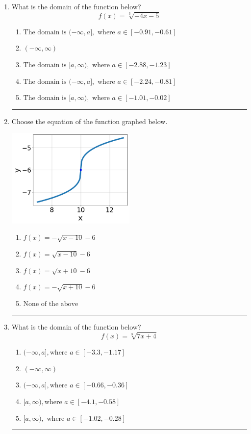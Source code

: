 \documentclass[14pt]{extbook}
\newcommand{\litem}[1]{\item#1\hspace*{-1cm}\rule{\textwidth}{0.4pt}}
\begin{document}
\begin{enumerate}
{\begin{enumerate}[label=\Alph*.]
\end{enumerate} }
\litem{
What is the domain of the function below?\[ f(x) = \sqrt[3]{-4 x - 5} \]\begin{enumerate}[label=\Alph*.]
\item \( \text{The domain is } (-\infty, a], \text{   where } a \in [-0.91, -0.61] \)
\item \( (-\infty, \infty) \)
\item \( \text{The domain is } [a, \infty), \text{   where } a \in [-2.88, -1.23] \)
\item \( \text{The domain is } (-\infty, a], \text{   where } a \in [-2.24, -0.81] \)
\item \( \text{The domain is } [a, \infty), \text{   where } a \in [-1.01, -0.02] \)

\end{enumerate} }
\litem{
Choose the equation of the function graphed below.
\begin{center}
    \includegraphics[width=0.5\textwidth]{../Figures/radicalGraphToEquationB.png}
\end{center}
\begin{enumerate}[label=\Alph*.]
\item \( f(x) = - \sqrt{x - 10} - 6 \)
\item \( f(x) = \sqrt{x - 10} - 6 \)
\item \( f(x) = \sqrt{x + 10} - 6 \)
\item \( f(x) = - \sqrt{x + 10} - 6 \)
\item \( \text{None of the above} \)

\end{enumerate} }
\litem{
What is the domain of the function below?\[ f(x) = \sqrt[8]{7 x + 4} \]\begin{enumerate}[label=\Alph*.]
\item \( (-\infty, a], \text{where } a \in [-3.3, -1.17] \)
\item \( (-\infty, \infty) \)
\item \( (-\infty, a], \text{where } a \in [-0.66, -0.36] \)
\item \( [a, \infty), \text{where } a \in [-4.1, -0.58] \)
\item \( [a, \infty), \text{ where } a \in [-1.02, -0.28] \)

\end{enumerate} }
\end{enumerate}
\end{document}
